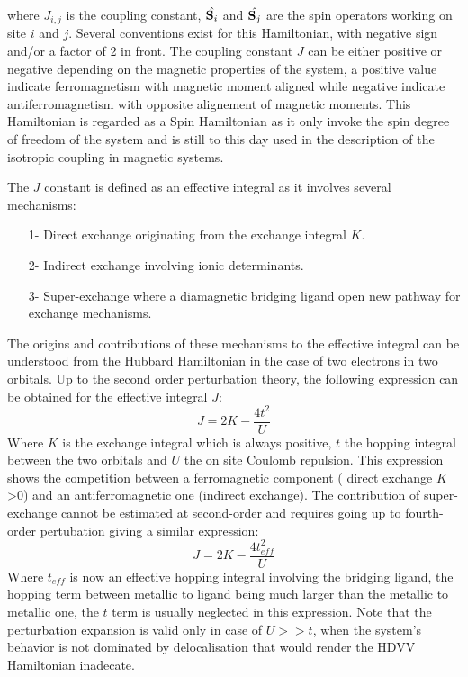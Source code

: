 \documentclass[10pt]{report}
\numberwithin{equation}{section}
\begin{document}
where $J_{i,j}$ is the coupling constant, $\hat{\vb S_i}$ and $\hat{\vb S_j}$ are the spin operators working on site $i$ and $j$.
Several conventions exist for this Hamiltonian, with negative sign and/or a factor of 2 in front.  
The coupling constant $J$ can be either positive or negative depending on the magnetic properties of the system, a positive value indicate ferromagnetism with magnetic moment aligned while negative indicate antiferromagnetism with opposite alignement of magnetic moments.
This Hamiltonian is regarded as a Spin Hamiltonian as it only invoke the spin degree of freedom of the system and is still to this day used in the description of the isotropic coupling in magnetic systems.

The $J$ constant is defined as an effective integral as it involves several mechanisms:
\begin{itemize}
    \item[1-] Direct exchange originating from the exchange integral $K$.
    \item[2-] Indirect exchange involving ionic determinants.
    \item[3-] Super-exchange where a diamagnetic bridging ligand open new pathway for exchange mechanisms.
\end{itemize}

The origins and contributions of these mechanisms to the effective integral can be understood from the Hubbard Hamiltonian in the case of two electrons in two orbitals.
Up to the second order perturbation theory, the following expression can be obtained for the effective integral $J$:
\begin{equation}
    J=2K-\frac{4t^2}{U}
\end{equation}
Where $K$ is the exchange integral which is always positive, $t$ the hopping integral between the two orbitals and $U$ the on site Coulomb repulsion.
This expression shows the competition between a ferromagnetic component ( direct exchange $K$>0) and an antiferromagnetic one (indirect exchange).
The contribution of super-exchange cannot be estimated at second-order and requires going up to fourth-order pertubation giving a similar expression:
\begin{equation}
    J=2K-\frac{4t_{eff}^2}{U}
\end{equation}
Where $t_{eff}$ is now an effective hopping integral involving the bridging ligand, the hopping term between metallic to ligand being much larger than the metallic to metallic one, the $t$ term is usually neglected in this expression.
Note that the perturbation expansion is valid only in case of $U>>t$, when the system's behavior is not dominated by delocalisation that would render the HDVV Hamiltonian inadecate.
\end{document}
